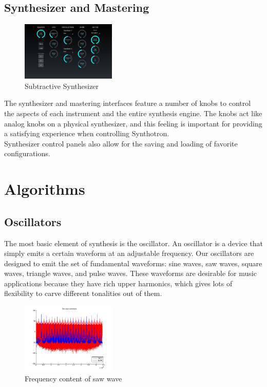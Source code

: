 \documentclass[letterpaper,12pt]{article}
\begin{document}
\subsection{Synthesizer and Mastering}

\begin{figure}
\centering
\includegraphics[width=0.4\textwidth]{figures/subtractivesynth.png}
\caption{Subtractive Synthesizer}
\label{fig:subtractivesynth}
\end{figure}

The synthesizer and mastering interfaces feature a number of knobs to control the aspects of each instrument and the entire synthesis engine. The knobs act like analog knobs on a physical synthesizer, and this feeling is important for providing a satisfying experience when controlling Synthotron. \\

Synthesizer control panels also allow for the saving and loading of favorite configurations.

\section{Algorithms}

\subsection{Oscillators}

The most basic element of synthesis is the oscillator. An oscillator is a device that simply emits a certain waveform at an adjustable frequency. Our oscillators are designed to emit the set of fundamental waveforms: sine waves, saw waves, square waves, triangle waves, and pulse waves. These waveforms are desirable for music applications because they have rich upper harmonics, which gives lots of flexibility to carve different tonalities out of them.

\begin{figure}
\centering
\includegraphics[width=0.4\textwidth]{figures/blep-spectrum.png}
\caption{Frequency content of saw wave}
\label{fig:polyblep-spectrum}
\end{figure}
\end{document}
